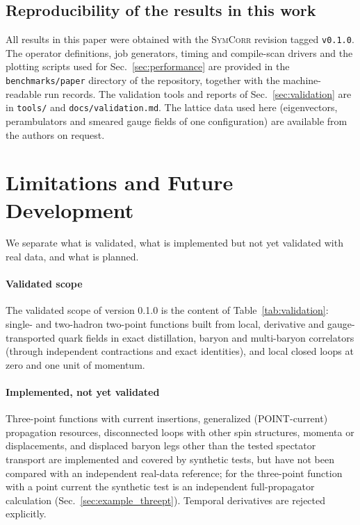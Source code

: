 \documentclass[a4paper,fleqn]{cas-dc}
\newcommand{\add}[1]{{\color{blue}#1}}
\begin{document}
\subsection{Reproducibility of the results in this work}

All results in this paper were obtained with the \textsc{SymCorr} revision tagged
\texttt{v0.1.0}. The operator definitions, job generators, timing and
compile-scan drivers and the plotting scripts used for Sec.~\ref{sec:performance}
are provided in the \texttt{benchmarks/paper} directory of the repository,
together with the machine-readable run records.
The validation tools and reports
of Sec.~\ref{sec:validation} are in \texttt{tools/} and \texttt{docs/validation.md}.
The lattice data used here (eigenvectors, perambulators and smeared gauge
fields of one configuration) are available from the authors on request.

\section{Limitations and Future Development}
\label{sec:limitations}

We separate what is validated, what is implemented but not yet validated with
real data, and what is planned.

\paragraph{Validated scope}
The validated scope of version 0.1.0 is the content of
Table~\ref{tab:validation}: single- and two-hadron two-point functions built from
local, derivative and gauge-transported quark fields in exact distillation,
baryon and multi-baryon correlators (through independent contractions and exact
identities), and local closed loops at zero and one unit of momentum.

\paragraph{Implemented, not yet validated}
Three-point functions with current insertions, generalized (POINT-current)
propagation resources, disconnected loops with other spin structures, momenta or
displacements, and displaced baryon legs other than the tested spectator transport
are implemented and covered by synthetic tests, but have not been compared with
an independent real-data reference\add{; for the three-point function with a point
current the synthetic test is an independent full-propagator calculation
(Sec.~\ref{sec:example_threept})}. Temporal derivatives are rejected explicitly.
\end{document}
